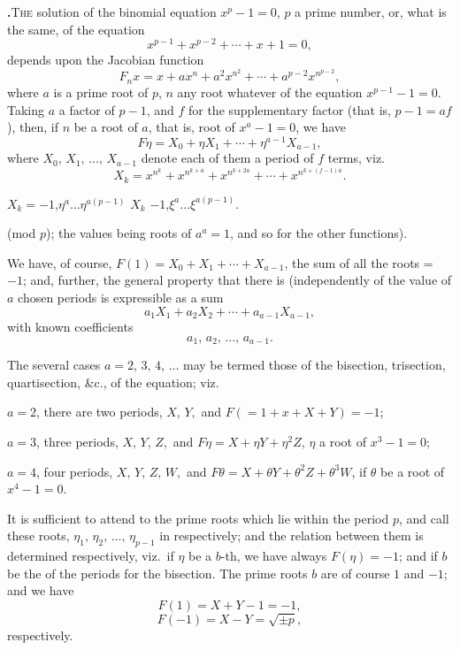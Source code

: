 \documentclass[11pt]{article}
\newcommand{\artno}[1]{\textbf{#1.}\quad}
\begin{document}
\bigskip

\noindent
\artno{}\textsc{The} solution of the binomial equation $x^p - 1 = 0$, $p$ a prime number, or, what is the same, of the equation
\[
x^{p-1} + x^{p-2} + \cdots + x + 1 = 0,
\]
depends upon the Jacobian function
\[
F_n x = x + a x^n + a^2 x^{n^2} + \cdots + a^{p-2} x^{n^{p-2}},
\]
where $a$ is a prime root of $p$, $n$ any root whatever of the equation $x^{p-1} - 1 = 0$. Taking
$a$ a factor of $p - 1$, and $f$ for the supplementary factor (that is, $p - 1 = af$), then, if
$n$ be a root of $a$, that is, root of $x^a - 1 = 0$, we have
\[
F\eta = X_0 + \eta X_1 + \cdots + \eta^{a-1} X_{a-1},
\]
where $X_0,\, X_1,\, \ldots,\, X_{a-1}$ denote each of them a period of $f$ terms, viz.
\[
X_k = x^{n^k} + x^{n^{k+a}} + x^{n^{k+2a}} + \cdots + x^{n^{k+(f-1)a}}.
\]

\noindent
$X_k = -1$,\qquad $\eta^a \ldots \eta^{a(p-1)}$
$X_k$ \quad $-1$,\qquad $\xi^a \ldots \xi^{a(p-1)}$.

\noindent
(mod $p$); the values being roots of $a^a = 1$, and so for the other functions).

\medskip

\noindent
We have, of course, $F(1) = X_0 + X_1 + \cdots + X_{a-1}$, the sum of all the roots = $-1$;
and, further, the general property that there is (independently of the value of $a$ chosen
periods is expressible as a sum
\[
a_1 X_1 + a_2 X_2 + \cdots + a_{a-1} X_{a-1},
\]
with known coefficients
\[
a_1,\, a_2,\, \ldots,\, a_{a-1}.
\]

\newpage

\noindent
The several cases $a = 2,\,3,\,4,\,\ldots$ may be termed those of the bisection, trisection,
quartisection, \&c., of the equation; viz.

$a = 2$, there are two periods, $X,\,Y,$ and $F(=1+x+X+Y)=-1$;

$a = 3$, three periods, $X,\,Y,\,Z,$ and $F\eta = X + \eta Y + \eta^2 Z$, $\eta$ a root of $x^3 - 1 = 0$;

$a = 4$, four periods, $X,\,Y,\,Z,\,W,$ and $F\theta = X + \theta Y + \theta^2 Z + \theta^3 W$, if $\theta$ be a root of $x^4 - 1 = 0$.

\medskip

\noindent
It is sufficient to attend to the prime roots which lie within the period $p$, and call
these roots, $\eta_1,\,\eta_2,\,\ldots,\,\eta_{p-1}$ in respectively; and the relation between them is determined
respectively, viz.\ if $\eta$ be a $b$-th, we have always $F(\eta) = -1$; and if $b$ be the of the
periods for the bisection. The prime roots $b$ are of course $1$ and $-1$; and we have
\[
F(1) = X + Y - 1 = -1,
\]
\[
F(-1) = X - Y = \sqrt{\pm p},
\]
respectively.
\end{document}
